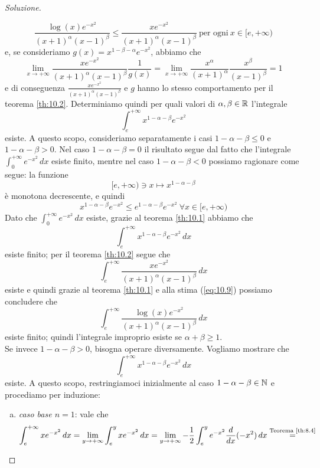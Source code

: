 \begin{proof}[Soluzione]
\begin{enumerate}[(i)]
\begin{equation}
            \frac{\log(x)e^{-x^2}}{(x+1)^\alpha(x-1)^\beta} \le \frac{xe^{-x^2}}{(x+1)^\alpha(x-1)^\beta} \ \text{per ogni} \ x\in [e,+\infty)
        \end{equation}
        e, se consideriamo $g(x) = x^{1-\beta-\alpha}e^{-x^2}$, abbiamo che
        \[
        \lim_{x\to +\infty} \frac{xe^{-x^2}}{(x+1)^\alpha (x-1)^\beta} \frac{1}{g(x)} = \lim_{x\to +\infty} \frac{x^\alpha}{(x+1)^\alpha} \frac{x^\beta}{(x-1)^\beta} = 1
        \]
        e di conseguenza $\frac{xe^{-x^2}}{(x+1)^\alpha (x-1)^\beta}$ e $g$ hanno lo stesso comportamento per il teorema \ref{th:10.2}. Determiniamo quindi per quali valori di $\alpha, \beta\in\amsbb{R}$ l'integrale
        \[
        \int_e^{+\infty} x^{1-\alpha-\beta} e^{-x^2}
        \]
        esiste. A questo scopo, consideriamo separatamente i casi $1-\alpha-\beta\le 0$ e $1-\alpha-\beta>0$. Nel caso $1-\alpha-\beta=0$ il risultato segue dal fatto che l'integrale $\int_0^{+\infty} e^{-x^2}\, dx$ esiste finito, mentre nel caso $1-\alpha-\beta<0$ possiamo ragionare come segue: la funzione
        \[
        [e,+\infty)\ni x \mapsto x^{1-\alpha-\beta}
        \]
        è monotona decrescente, e quindi
        \[
        x^{1-\alpha-\beta}e^{-x^2}\le e^{1-\alpha-\beta}e^{-x^2} \ \forall x\in[e, +\infty)
        \]
        Dato che $\int_0^{+\infty}e^{-x^2}\, dx$ esiste, grazie al teorema \ref{th:10.1} abbiamo che
        \[
        \int_e^{+\infty} x^{1-\alpha-\beta} e^{-x^2}\, dx
        \]
        esiste finito; per il teorema \ref{th:10.2} segue che
        \[
        \int_e^{+\infty} \frac{xe^{-x^2}}{(x+1)^\alpha(x-1)^\beta}\, dx
        \]
        esiste e quindi grazie al teorema \ref{th:10.1} e alla stima (\ref{eq:10.9}) possiamo concludere che
        \[
        \int_e^{+\infty}\frac{\log(x)e^{-x^2}}{(x+1)^\alpha(x-1)^\beta}\, dx
        \]
        esiste finito; quindi l'integrale improprio esiste se $\alpha+\beta\ge 1$.\\
        Se invece $1-\alpha-\beta>0$, bisogna operare diversamente. Vogliamo mostrare che
        \[
        \int_e^{+\infty}x^{1-\alpha-\beta} e^{-x^2}\, dx 
        \]
        esiste. A questo scopo, restringiamoci inizialmente al caso $1-\alpha-\beta\in\amsbb{N}$ e procediamo per induzione:
        \begin{enumerate}[(a)]
            \item \emph{caso base $n=1$}: vale che
            \[
            \begin{split}
                \int_e^{+\infty} x e^{-x^2}\, dx & = \lim_{y\to +\infty} \int_e^y x e^{-x^2}\, dx = \lim_{y\to +\infty} -\frac{1}{2}\int_e^y e^{-x^2} \frac{d}{dx}(-x^2)\, dx \overset{\text{Teorema \ref{th:8.4}}}{=} \\

\end{split}\]
\end{enumerate}
\end{enumerate}
\end{proof}
